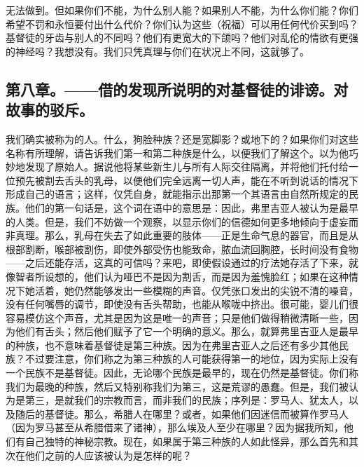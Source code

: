 无法做到。但如果你们不能，为什么别人能？如果别人不能，为什么你们能？你们希望不罚和永恒要付出什么代价？你们认为这些（祝福）可以用任何代价买到吗？基督徒的牙齿与别人的不同吗？他们有更宽大的下颌吗？他们对乱伦的情欲有更强的神经吗？我想没有。我们只凭真理与你们在状况上不同，这就够了。\par


\subsection{第八章。——借的发现所说明的对基督徒的诽谤。对故事的驳斥。}

我们确实被称为的人。什么，狗脸种族？还是宽脚影？或地下的？如果你们对这些名称有所理解，请告诉我们第一和第二种族是什么，以便我们了解这个。以为他巧妙地发现了原始人。据说他将某些新生儿与所有人际交往隔离，并将他们托付给一位预先被割去舌头的乳母，以便他们完全远离一切人声，能在不听到说话的情况下形成自己的语言；这样，仅凭自身，就能指示出那第一个其语言由自然所规定的民族。他们的第一句话是，这个词在语中的意思是：因此，弗里吉亚人被认为是最早的人类。但是，我们不妨做一个观察，以显示你们的信德如何更多地倾向于虚妄而非真理。那么，乳母在失去了如此重要的肢体——正是生命气息的器官，而且是从根部割断，喉部被割伤，即使外部受伤也能致命，脓血流回胸腔，长时间没有食物——之后还能存活，这真的可信吗？来吧，即使假设通过的疗法她存活了下来，就像智者所设想的，他们认为哑巴不是因为割舌，而是因为羞愧脸红；如果在这种情况下她活着，她仍然能够发出一些模糊的声音。仅凭张口发出的尖锐不清的噪音，没有任何嘴唇的调节，即使没有舌头帮助，也能从喉咙中挤出。很可能，婴儿们很容易模仿这个声音，尤其是因为这是唯一的声音；只是他们做得稍微清晰一些，因为他们有舌头；然后他们赋予了它一个明确的意义。那么，就算弗里吉亚人是最早的种族，也不意味着基督徒是第三种族。因为在弗里吉亚人之后还有多少其他民族？不过要注意，你们称之为第三种族的人可能获得第一的地位，因为实际上没有一个民族不是基督徒。因此，无论哪个民族是最早的，现在仍然是基督徒。你们称我们为最晚的种族，然后又特别称我们为第三，这是荒谬的愚蠢。但是，我们被认为是第三，是就我们的宗教而言，而非我们的民族；序列是：罗马人、犹太人，以及随后的基督徒。那么，希腊人在哪里？或者，如果他们因迷信而被算作罗马人（因为罗马甚至从希腊借来了诸神），那么埃及人至少在哪里？因为据我所知，他们有自己独特的神秘宗教。现在，如果属于第三种族的人如此怪异，那么首先和其次在他们之前的人应该被认为是怎样的呢？\par

